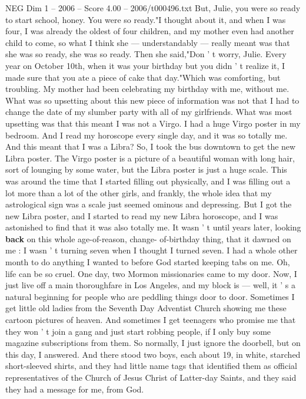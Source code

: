 \begin{textsample}{NEG Dim 1 – 2006 – Score 4.00 – 2006/t000496.txt}
But, Julie, you were so ready to start school, honey.
You were so ready."I thought about it, and when I was four, I was already the oldest of four children, and my mother even had another child to come, so what I think she — understandably — really meant was that she was so ready, she was so ready.
Then she said,"Don ' t worry, Julie.
Every year on October 10th, when it was your birthday but you didn ' t realize it, I made sure that you ate a piece of cake that day."Which was comforting, but troubling.
My mother had been celebrating my birthday with me, without me.
What was so upsetting about this new piece of information was not that I had to change the date of my slumber party with all of my girlfriends.
What was most upsetting was that this meant I was not a Virgo.
I had a huge Virgo poster in my bedroom.
And I read my horoscope every single day, and it was so totally me.
And this meant that I was a Libra?
So, I took the bus downtown to get the new Libra poster.
The Virgo poster is a picture of a beautiful woman with long hair, sort of lounging by some water, but the Libra poster is just a huge scale.
This was around the time that I started filling out physically, and I was filling out a lot more than a lot of the other girls, and frankly, the whole idea that my astrological sign was a scale just seemed ominous and depressing.
But I got the new Libra poster, and I started to read my new Libra horoscope, and I was astonished to find that it was also totally me.
It wasn ' t until years later, looking \textbf{back} on this whole age-of-reason, change- of-birthday thing, that it dawned on me : I wasn ' t turning seven when I thought I turned seven.
I had a whole other month to do anything I wanted to before God started keeping tabs on me.
Oh, life can be so cruel.
One day, two Mormon missionaries came to my door.
Now, I just live off a main thoroughfare in Los Angeles, and my block is — well, it ' s a natural beginning for people who are peddling things door to door.
Sometimes I get little old ladies from the Seventh Day Adventist Church showing me these cartoon pictures of heaven.
And sometimes I get teenagers who promise me that they won ' t join a gang and just start robbing people, if I only buy some magazine subscriptions from them.
So normally, I just ignore the doorbell, but on this day, I answered.
And there stood two boys, each about 19, in white, starched short-sleeved shirts, and they had little name tags that identified them as official representatives of the Church of Jesus Christ of Latter-day Saints, and they said they had a message for me, from God.

\end{textsample}
